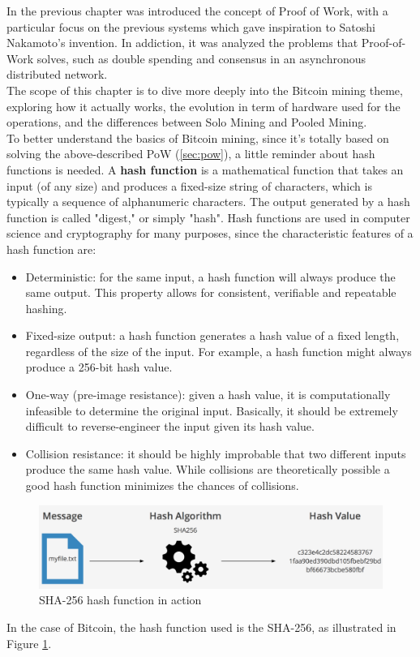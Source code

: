 In the previous chapter was introduced the concept of Proof of Work, with a particular focus on the previous systems which gave inspiration to Satoshi Nakamoto's invention. In addiction, it was analyzed the problems that Proof-of-Work solves, such as double spending and consensus in an asynchronous distributed network.\\
The scope of this chapter is to dive more deeply into the Bitcoin mining theme, exploring how it actually works, the evolution in term of hardware used for the operations, and the differences between Solo Mining and Pooled Mining.\\

\noindent To better understand the basics of Bitcoin mining, since it's totally based on solving the above-described PoW (\ref{sec:pow}), a little reminder about hash functions is needed.
A \textbf{hash function} is a mathematical function that takes an input (of any size) and
produces a fixed-size string of characters, which is typically a sequence of alphanumeric characters. The output generated by a hash function is called "digest," or simply "hash". Hash functions are used in computer science and cryptography for many purposes, since the characteristic features of a hash function are:
\begin{itemize}
    \item Deterministic: for the same input, a hash function will always produce the same output. This property allows for consistent, verifiable and repeatable hashing.
    \item Fixed-size output: a hash function generates a hash value of a fixed length, regardless of the size of the input. For example, a hash function might always produce a 256-bit hash value.
    \item One-way (pre-image resistance): given a hash value, it is computationally infeasible to determine the original input. Basically, it should be extremely difficult to reverse-engineer the input given its hash value.
    \item Collision resistance: it should be highly improbable that two different inputs produce the same hash value. While collisions are theoretically possible a good hash function minimizes the chances of collisions.
\end{itemize}

\begin{figure}[h!]
\centering
\includegraphics[width=15cm]{Figures/mining/sha256.png}
\caption{SHA-256 hash function in action}
\label{fig:sha256}
\end{figure}

\noindent In the case of Bitcoin, the hash function used is the SHA-256, as illustrated in Figure \ref{fig:sha256}.
